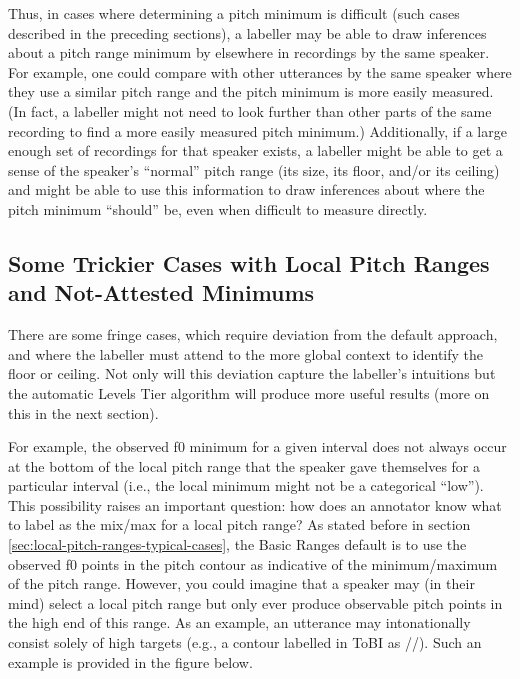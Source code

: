 Thus, in cases where determining a pitch minimum is difficult (such cases described in the preceding sections), a labeller may be able to draw inferences about a pitch range minimum by elsewhere in recordings by the same speaker. For example, one could compare with other utterances by the same speaker where they use a similar pitch range and the pitch minimum is more easily measured. (In fact, a labeller might not need to look further than other parts of the same recording to find a more easily measured pitch minimum.) Additionally, if a large enough set of recordings for that speaker exists, a labeller might be able to get a sense of the speaker’s “normal” pitch range (its size, its floor, and/or its ceiling) and might be able to use this information to draw inferences about where the pitch minimum “should” be, even when difficult to measure directly.

\subsection{Some Trickier Cases with Local Pitch Ranges and Not-Attested Minimums}\label{sec:some-trickier-cases-with-local-pitch-ranges}

There are some fringe cases, which require deviation from the default approach, and where the labeller must attend to the more global context to identify the floor or ceiling. Not only will this deviation capture the labeller’s intuitions but the automatic Levels Tier algorithm will produce more useful results (more on this in the next section).

For example, the observed f0 minimum for a given interval does not always occur at the bottom of the local pitch range that the speaker gave themselves for a particular interval (i.e., the local minimum might not be a categorical “low”). This possibility raises an important question: how does an annotator know what to label as the mix\slash max for a local pitch range? As stated before in section \ref{sec:local-pitch-ranges-typical-cases}, the Basic Ranges default is to use the observed f0 points in the pitch contour as indicative of the minimum\slash maximum of the pitch range. However, you could imagine that a speaker may (in their mind) select a local pitch range but only ever produce observable pitch points in the high end of this range. As an example, an utterance may intonationally consist solely of high targets (e.g., a contour labelled in ToBI as //). Such an example is provided in the figure below.

